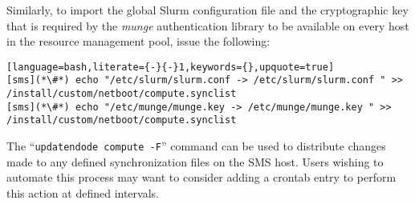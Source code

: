 \noindent Similarly, to import the global Slurm configuration file and the cryptographic
key that is required by the {\em munge} authentication library to be available
on every host in the resource management pool, issue the following:

\begin{lstlisting}[language=bash,literate={-}{-}1,keywords={},upquote=true]
[sms](*\#*) echo "/etc/slurm/slurm.conf -> /etc/slurm/slurm.conf " >> /install/custom/netboot/compute.synclist
[sms](*\#*) echo "/etc/munge/munge.key -> /etc/munge/munge.key " >> /install/custom/netboot/compute.synclist
\end{lstlisting}

\begin{center}
\begin{tcolorbox}[]
\small
The ``\texttt{updatendode compute -F}'' command can be used to distribute changes made to any
defined synchronization files on the SMS host. Users wishing to automate this process may
want to consider adding a crontab entry to perform this action at defined intervals.
\end{tcolorbox}
\end{center}
